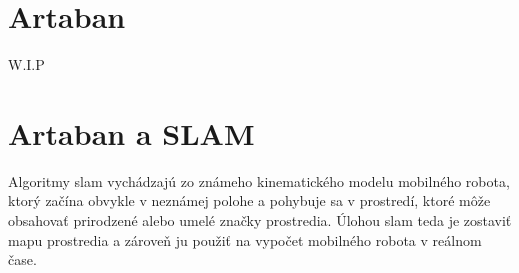 \section{Artaban}
\begin{center}
    W.I.P
\end{center}

\section{Artaban a SLAM}
Algoritmy \acrshort{slam} vychádzajú zo známeho kinematického modelu mobilného robota, ktorý začína obvykle v neznámej polohe a pohybuje sa v prostredí, ktoré môže obsahovať prirodzené alebo umelé značky prostredia. Úlohou \acrshort{slam} teda je zostaviť mapu prostredia a zároveň ju použiť na vypočet mobilného robota v reálnom čase.\cite{fs1}\newline

